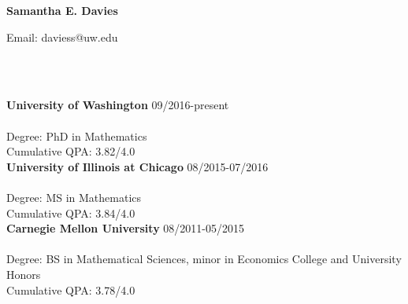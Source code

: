 \documentclass[11 pt]{article}
\newcommand{\lineunder}{\vspace*{-8pt} \\ \hspace*{-18pt} \hrulefill \\}
\newcommand{\header}[1]{{\hspace*{-15pt}\vspace*{6pt} \selectfont{\textsc{#1}}} \vspace*{-6pt} \lineunder}
\newcommand{\employer}[3]{{ \textbf{#1} \hfill #2\\ \underline{\textbf{#3}}\\  }}
\newcommand{\schoolwithcourses}[4]{
 \textbf{#1} #2 #3\\ 
#4 \\

\vspace*{5pt}
}
\begin{document}
\small
\smallskip
\vspace*{-65pt}
{\fontsize{35}{40}\hspace*{-15pt}\selectfont\bf{Samantha E. Davies}}
  {\hfill


\vspace{2 mm}

{\fontsize{11}{5}{\header{\selectfont{Contact Information}}}
\vspace{1mm}
Email: daviess@uw.edu  \qquad 
\vspace{1mm}


\header{Education}
\vspace{2mm}

\employer{University of Washington}{09/2016-present}{}
\vspace{-4mm}
Degree: PhD in Mathematics\\
Cumulative QPA: 3.82/4.0\\

\vspace{2 mm}
\employer{University of Illinois at Chicago}{08/2015-07/2016}{}
\vspace{-4mm}
Degree:  MS in Mathematics \\
Cumulative QPA: 3.84/4.0\\
\vspace{2 mm}
\employer{Carnegie Mellon University}{08/2011-05/2015}{}
\vspace{-4mm}
Degree: BS in Mathematical Sciences, minor in Economics \hspace{25mm} College and University Honors\\
Cumulative QPA: 3.78/4.0\\




}}
\end{document}
